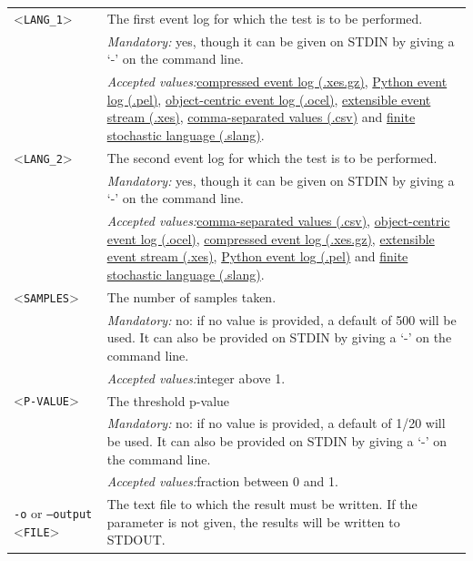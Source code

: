 {\begin{tabularx}{\linewidth}{lX}
<\texttt{LANG\_1}>&The first event log for which the test is to be performed.\\
&\textit{Mandatory:} \quad yes, though it can be given on STDIN by giving a `-' on the command line.\\
&\textit{Accepted values:}\quad \hyperref[filehandler:compressed event log]{compressed event log (.xes.gz)}, \hyperref[filehandler:Python event log]{Python event log (.pel)}, \hyperref[filehandler:object-centric event log]{object-centric event log (.ocel)}, \hyperref[filehandler:extensible event stream]{extensible event stream (.xes)}, \hyperref[filehandler:comma-separated values]{comma-separated values (.csv)} and \hyperref[filehandler:finite stochastic language]{finite stochastic language (.slang)}.\\
<\texttt{LANG\_2}>&The second event log for which the test is to be performed.\\
&\textit{Mandatory:} \quad yes, though it can be given on STDIN by giving a `-' on the command line.\\
&\textit{Accepted values:}\quad \hyperref[filehandler:comma-separated values]{comma-separated values (.csv)}, \hyperref[filehandler:object-centric event log]{object-centric event log (.ocel)}, \hyperref[filehandler:compressed event log]{compressed event log (.xes.gz)}, \hyperref[filehandler:extensible event stream]{extensible event stream (.xes)}, \hyperref[filehandler:Python event log]{Python event log (.pel)} and \hyperref[filehandler:finite stochastic language]{finite stochastic language (.slang)}.\\
<\texttt{SAMPLES}>&The number of samples taken.\\
&\textit{Mandatory:} \quad no: if no value is provided, a default of 500 will be used. It can also be provided on STDIN by giving a `-' on the command line.\\
&\textit{Accepted values:}\quad integer above 1.\\
<\texttt{P-VALUE}>&The threshold p-value\\
&\textit{Mandatory:} \quad no: if no value is provided, a default of 1/20 will be used. It can also be provided on STDIN by giving a `-' on the command line.\\
&\textit{Accepted values:}\quad fraction between 0 and 1.\\
\texttt{-o} or \texttt{--output} <\texttt{FILE}> &
The text file to which the result must be written. If the parameter is not given, the results will be written to STDOUT.\\

\end{tabularx}}
